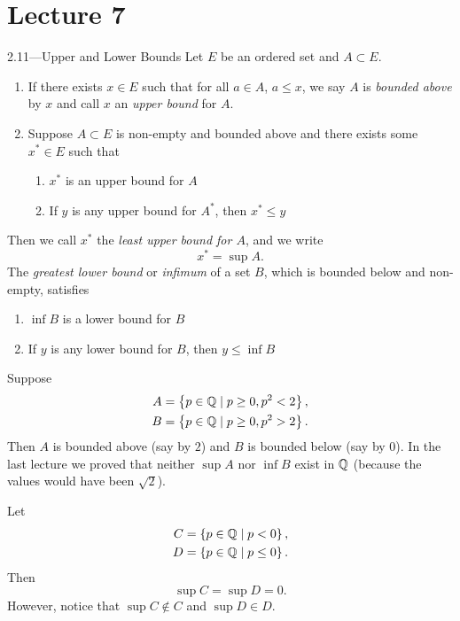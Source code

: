 \documentclass[class=article, crop=false]{standalone}
\begin{document}
  \section{Lecture 7}
  \begin{definition}{2.11---Upper and Lower Bounds}
    Let $E$ be an ordered set and $A\subset E$.
    \begin{enumerate}[label=(\alph*)]
      \item If there exists $x\in E$ such that for all $a\in A$, $a\leq x$, we say $A$ is \emph{bounded above} by $x$ and call $x$ an \emph{upper bound} for $A$.
      \item Suppose $A\subset E$ is non-empty and bounded above and there exists some $x^*\in E$ such that
      \begin{enumerate}[label=\roman*)]
        \item $x^*$ is an upper bound for $A$
        \item If $y$ is any upper bound for $A^*$, then $x^*\leq y$
      \end{enumerate}
    \end{enumerate}
    Then we call $x^*$ the \emph{least upper bound for $A$}, and we write
    \[
      x^* = \sup A. \tag{sup meaning supremum}
    \]
    The \emph{greatest lower bound} or \emph{infimum} of a set $B$, which is bounded below and non-empty, satisfies
    \begin{enumerate}[label=\roman*)]
      \item $\inf B$ is a lower bound for $B$
      \item If $y$ is any lower bound for $B$, then $y\leq \inf B$
    \end{enumerate}
  \end{definition}
  \begin{example}{}
    Suppose
    \begin{align*}
      A &= \left\{p\in \mathbb{Q}\mid p\geq 0, p^2 < 2\right\}, \\
      B &= \left\{p\in \mathbb{Q}\mid p\geq 0, p^2 > 2\right\}.
    \end{align*}
    Then $A$ is bounded above (say by $2$) and $B$ is bounded below (say by $0$). In the last lecture we proved that neither $\sup A$ nor $\inf B$ exist in $\mathbb{Q}$ (because the values would have been $\sqrt 2$).
  \end{example}
  \begin{example}{}
    Let
    \begin{align*}
      C &= \left\{p\in\mathbb{Q}\mid p < 0\right\}, \\
      D &= \left\{p\in\mathbb{Q}\mid p \leq 0\right\}.
    \end{align*}
    Then
    \[
      \sup C = \sup D = 0.
    \]
    However, notice that $\sup C\notin C$ and $\sup D\in D$.
  \end{example}
\end{document}
